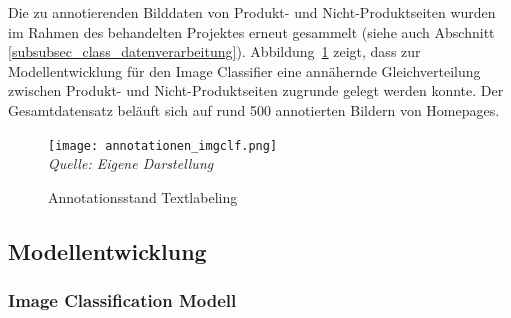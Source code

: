 Die zu annotierenden Bilddaten von Produkt- und Nicht-Produktseiten wurden im Rahmen des behandelten Projektes erneut gesammelt (siehe auch Abschnitt \ref{subsubsec_class_datenverarbeitung}).
Abbildung~\ref{fig:annotation_imgclf} zeigt, dass zur Modellentwicklung für den Image Classifier eine annähernde Gleichverteilung zwischen Produkt-
und Nicht-Produktseiten zugrunde gelegt werden konnte.
Der Gesamtdatensatz beläuft sich auf rund 500 annotierten Bildern von Homepages.
\begin{figure}[H]
	\caption{Annotationsstand Textlabeling}\label{fig:annotation_imgclf}
	\texttt{[image: annotationen\_imgclf.png]}
	\\
	\textit{Quelle: Eigene Darstellung}
\end{figure}


\subsection{Modellentwicklung}

\subsubsection{Image Classification Modell}


